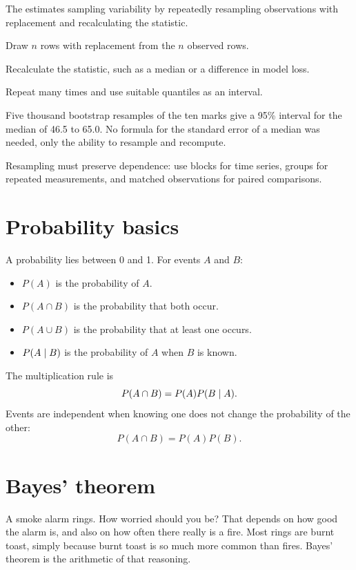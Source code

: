 The  estimates sampling variability by repeatedly resampling observations with replacement and recalculating the statistic.

\begin{utpsteps}
  \item Draw $n$ rows with replacement from the $n$ observed rows.
  \item Recalculate the statistic, such as a median or a difference in model loss.
  \item Repeat many times and use suitable quantiles as an interval.
\end{utpsteps}

\begin{workedexample}
Five thousand bootstrap resamples of the ten marks give a 95\% interval for the median of 46.5 to 65.0. No formula for the standard error of a median was needed, only the ability to resample and recompute.
\end{workedexample}

Resampling must preserve dependence: use blocks for time series, groups for repeated measurements, and matched observations for paired comparisons.

\section{Probability basics}

A probability lies between 0 and 1. For events $A$ and $B$:

\begin{itemize}
  \item $P(A)$ is the probability of $A$.
  \item $P(A\cap B)$ is the probability that both occur.
  \item $P(A\cup B)$ is the probability that at least one occurs.
  \item $P(A\mathrel{|} B)$ is the probability of $A$ when $B$ is known.
\end{itemize}

The multiplication rule is
\[
  P(A\cap B)=P(A)P(B\mathrel{|} A).
\]
Events are independent when knowing one does not change the probability of the other:
\[
  P(A\cap B)=P(A)P(B).
\]

\section{Bayes' theorem}

\begin{analogy}
A smoke alarm rings. How worried should you be? That depends on how good the alarm is, and also on how often there really is a fire. Most rings are burnt toast, simply because burnt toast is so much more common than fires. Bayes' theorem is the arithmetic of that reasoning.
\end{analogy}

